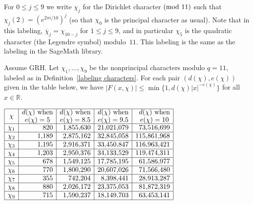 \documentclass[10pt,a4paper]{amsart}
\newcommand{\R}{\mathbb R}
\renewcommand{\bar}{\overline}
\renewcommand{\mod}[1]{{\ifmmode\text{\rm\ (mod~$#1$)}\else\discretionary{}{}{\hbox{\!\!}}\rm(mod~$#1$)\fi}}
\begin{document}
\begin{definition} \label{labeling characters}
For $0\le j\le 9$ we write $\chi_j$ for the Dirichlet character$\mod{11}$ such that $\chi_j(2) = (e^{2\pi i/10})^j$ (so that $\chi_0$ is the principal character as usual). Note that in this labeling, $\bar\chi_j = \chi_{10-j}$ for $1\le j\le 9$, and in particular $\chi_5$ is the quadratic character (the Legendre symbol) modulo~$11$. This labeling is the same as the labeling in the SageMath library.
\end{definition}

\begin{lemma} \label{dchi and echi lemma}
Assume GRH. Let $\chi_1,\dots,\chi_9$ be the nonprincipal characters modulo $q=11$, labeled as in Definition~\ref{labeling characters}. For each pair $(d(\chi),e(\chi))$ given in the table below, we have $|F(x,\chi)| \le \min\{1,d(\chi)|x|^{-e(\chi)} \}$ for all $x\in\R$.
\begin{center}$
\begin{array}{|c|r|r|r|r|}
\hline
\chi & \substack{\textstyle d(\chi)\text{ when} \\ \textstyle e(\chi)=5} & \substack{\textstyle d(\chi)\text{ when} \\ \textstyle e(\chi)=8.5} & \substack{\textstyle d(\chi)\text{ when} \\ \textstyle e(\chi)=9.5} & \substack{\textstyle d(\chi)\text{ when} \\ \textstyle e(\chi)=10} \\ \hline
\chi_1 & 820 & 1{,}855{,}630 & 21{,}021{,}079 & 73{,}516{,}699 \\ \hline
\chi_2 & 1{,}189 & 2{,}875{,}162 & 32{,}845{,}058 & 115{,}861{,}968 \\ \hline
\chi_3 & 1{,}195 & 2{,}916{,}371 & 33{,}450{,}847 & 116{,}963{,}421 \\ \hline
\chi_4 & 1{,}203 & 2{,}950{,}376 & 34{,}133{,}529 & 119{,}474{,}311 \\ \hline
\chi_5 & 678 & 1{,}549{,}125 & 17{,}785{,}195 & 61{,}586{,}977 \\ \hline
\chi_6 & 770 & 1{,}800{,}290 & 20{,}607{,}026 & 71{,}566{,}480 \\ \hline
\chi_7 & 355 & 742{,}204 & 8{,}398{,}441 & 28{,}913{,}287 \\ \hline
\chi_8 & 880 & 2{,}026{,}172 & 23{,}375{,}053 & 81{,}872{,}319 \\ \hline
\chi_9 & 715 & 1{,}590{,}237 & 18{,}149{,}703 & 63{,}453{,}141 \\ \hline
\end{array}
$\end{center}
\end{lemma}
\end{document}
